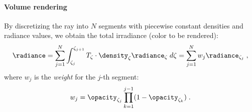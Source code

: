 \paragraph{Volume rendering}
By discretizing the ray into $N$ segments with piecewise constant densities and radiance values, we obtain the total irradiance (color to be rendered): %
\begin{equation}
    \begin{aligned}
      \radiance = \sum_{j=1}^N \int_{\zeta_j}^{\zeta_{j+1}}  T_{\zeta} \cdot \density_\zeta \radiance_\zeta \;d\zeta  
      = \sum_{j=1}^N  w_j \radiance_{\zeta_j}\;,
    \end{aligned}
    \label{eq: vol_render_nerf}
\end{equation}
where $w_j$ is the \textit{weight} for the $j$-th segment:
\begin{equation}
    \label{eq:weights_nerf}
    w_j = \opacity_{\zeta_j}\prod_{k=1}^{j-1}(1 - \opacity_{\zeta_k})\;.
\end{equation}